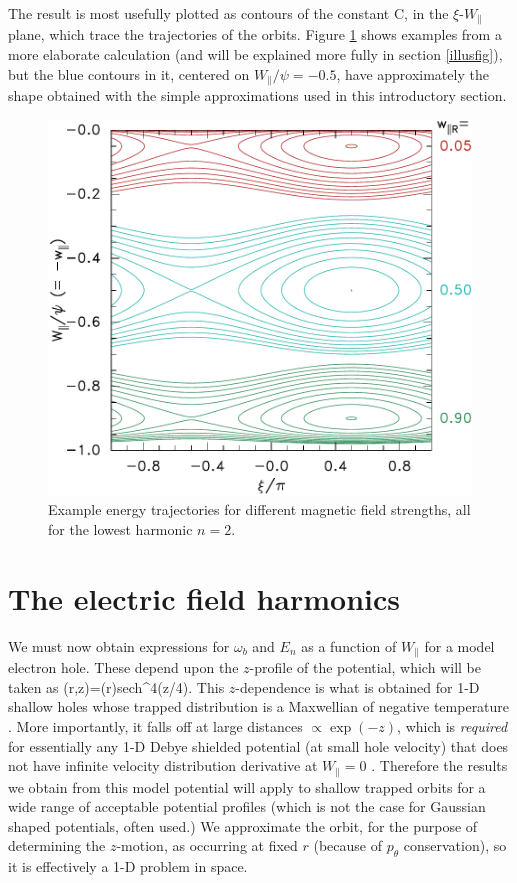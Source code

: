 \documentclass{agujournal2019}
\let\oldequation\equation
\let\oldendequation\endequation
\renewenvironment{equation}
  {\linenomathNonumbers\oldequation}
  {\oldendequation\endlinenomath}
\def\citep{\cite}
\begin{document}
The result is most usefully plotted as contours of the constant C, in
the $\xi$-$W_\parallel$ plane, which trace the trajectories of the
orbits. Figure \ref{fig:entraj} shows examples from a more elaborate
calculation (and will be explained more fully in section
\ref{illusfig}), but the blue contours in it, centered on
$W_\parallel/\psi=-0.5$, have approximately the shape obtained with the
simple approximations used in this introductory section.
\begin{figure}%
  \centering
  \includegraphics[width=0.6\hsize]{cont559}
  \caption{Example energy trajectories for different magnetic field strengths,
  all for the lowest harmonic $n=2$.}
  \label{fig:entraj}
\end{figure}

\section{The electric field harmonics}

We must now obtain expressions for $\omega_b$ and $E_n$ as a function
of $W_\parallel$ for a model electron hole. These depend upon the
$z$-profile of the potential, which will be taken as
\begin{equation}
  \label{eq:phiofz}
  \phi(r,z)=\psi(r){\rm sech}^4(z/4).
\end{equation}
This $z$-dependence is what is obtained for 1-D shallow holes whose
trapped distribution is a Maxwellian of negative
temperature \citep{Schamel1979}. More importantly, it falls off at
large distances $\propto \exp(-z)$, which is \emph{required} for
essentially any 1-D Debye shielded potential (at small hole velocity)
that does not have infinite velocity distribution derivative at
$W_\parallel=0$ \citep{Hutchinson2017}. Therefore the results we obtain from this model
potential will apply to shallow trapped orbits for a wide range of
acceptable potential profiles (which is not the case for Gaussian
shaped potentials, often used.)  We approximate the orbit, for the
purpose of determining the $z$-motion, as occurring at fixed $r$
(because of $p_\theta$ conservation), so it is effectively a 1-D
problem in space.
\end{document}
